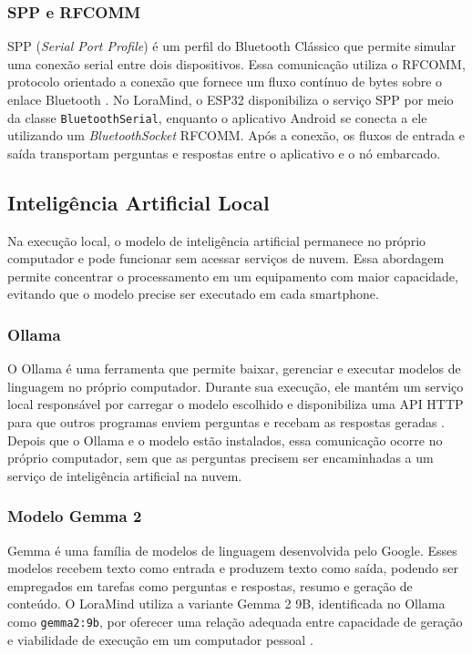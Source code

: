 \documentclass[12pt]{article}
\begin{document}
\subsubsection{SPP e RFCOMM}
\label{subsubsec:spp-rfcomm}

SPP (\textit{Serial Port Profile}) é um perfil do Bluetooth Clássico que permite simular uma conexão serial entre dois dispositivos. Essa comunicação utiliza o RFCOMM, protocolo orientado a conexão que fornece um fluxo contínuo de bytes sobre o enlace Bluetooth \cite{bluetoothsigsp,androidbluetooth2026}. No LoraMind, o ESP32 disponibiliza o serviço SPP por meio da classe \texttt{BluetoothSerial}, enquanto o aplicativo Android se conecta a ele utilizando um \textit{BluetoothSocket} RFCOMM. Após a conexão, os fluxos de entrada e saída transportam perguntas e respostas entre o aplicativo e o nó embarcado.

\subsection{Inteligência Artificial Local}
\label{subsec:inteligencia-artificial-local}

Na execução local, o modelo de inteligência artificial permanece no próprio computador e pode funcionar sem acessar serviços de nuvem. Essa abordagem permite concentrar o processamento em um equipamento com maior capacidade, evitando que o modelo precise ser executado em cada smartphone.

\subsubsection{Ollama}

O Ollama é uma ferramenta que permite baixar, gerenciar e executar modelos de linguagem no próprio computador. Durante sua execução, ele mantém um serviço local responsável por carregar o modelo escolhido e disponibiliza uma API HTTP para que outros programas enviem perguntas e recebam as respostas geradas \cite{ollamaapi2026}. Depois que o Ollama e o modelo estão instalados, essa comunicação ocorre no próprio computador, sem que as perguntas precisem ser encaminhadas a um serviço de inteligência artificial na nuvem.

\subsubsection{Modelo Gemma 2}

Gemma é uma família de modelos de linguagem desenvolvida pelo Google. Esses modelos recebem texto como entrada e produzem texto como saída, podendo ser empregados em tarefas como perguntas e respostas, resumo e geração de conteúdo. O LoraMind utiliza a variante Gemma 2 9B, identificada no Ollama como \texttt{gemma2:9b}, por oferecer uma relação adequada entre capacidade de geração e viabilidade de execução em um computador pessoal \cite{gemmateam2024gemma2}.
\end{document}
